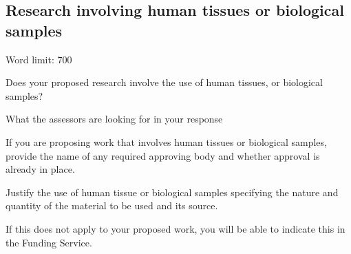 \documentclass[11pt]{article}
\newenvironment{instruction}{%
    \begin{tcolorbox}[breakable,colback=red!5,colframe=red,title=Instruction]%
	}{%
    	\end{tcolorbox}%
	}
\begin{document}
\pagebreak
\subsection{Research involving human tissues or biological samples}

\begin{instruction}

Word limit: 700

Does your proposed research involve the use of human tissues, or biological
samples?

What the assessors are looking for in your response

If you are proposing work that involves human tissues or biological samples,
provide the name of any required approving body and whether approval is
already in place.

Justify the use of human tissue or biological samples specifying the nature and
quantity of the material to be used and its source.

If this does not apply to your proposed work, you will be able to indicate this in
the Funding Service.

\end{instruction}
\end{document}
